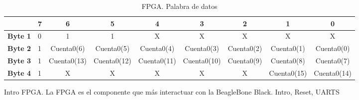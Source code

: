 \begin{table}[h]
		\begin{tabularx}{\textwidth}{|l|X|c|c|c|c|c|c|c|}
			\hline
			\rowcolor[HTML]{C0C0C0} 
			\multicolumn{1}{|r|}{\textbf{Bit}}    	& 7 & 6           & 5 		& 4 	      & 3 	    & 2 	 & 1           & 0 	     	\\ \hline
			\cellcolor[HTML]{C0C0C0}\textbf{Byte 1} & 0 & 1           & 1  		& X	      & X	    & X	  	 & X	       & X	     	\\ \hline
			\cellcolor[HTML]{C0C0C0}\textbf{Byte 2} & 1 & Cuenta0(6)  & Cuenta0(5) 	& Cuenta0(4)  & Cuenta0(3)  & Cuenta0(2) & Cuenta0(1)  & Cuenta0(0)  	\\ \hline
			\cellcolor[HTML]{C0C0C0}\textbf{Byte 3} & 1 & Cuenta0(13) & Cuenta0(12)	& Cuenta0(11) & Cuenta0(10) & Cuenta0(9) & Cuenta0(8)  & Cuenta0(7)  	\\ \hline
			\cellcolor[HTML]{C0C0C0}\textbf{Byte 4} & 1 & X		  & X	 	& X	      & X	    & X		 & Cuenta0(15) & Cuenta0(14)	\\ \hline
		\end{tabularx}
		\caption{FPGA. Palabra de datos}
		\label{tab:FPGAUart1}
	\end{table}


	Intro FPGA. La FPGA es el componente que más interactuar con la BeagleBone Black.
	Intro, Reset, UARTS 
